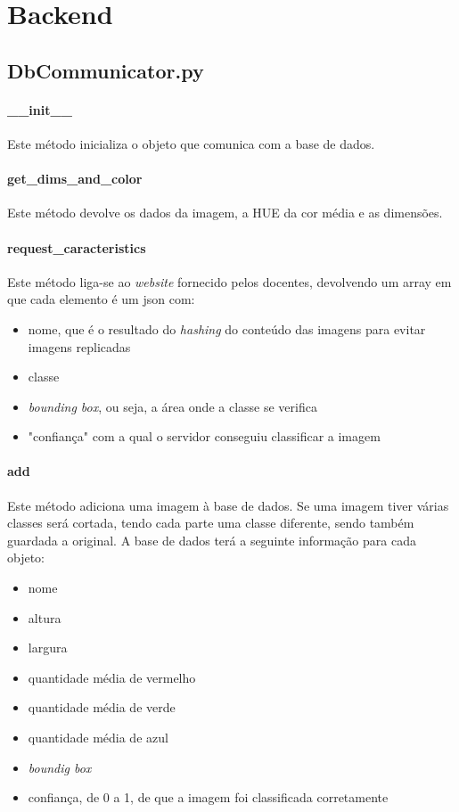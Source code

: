 \documentclass{report}
\begin{document}
\section{Backend}
\subsection{DbCommunicator.py}
\paragraph{\_\_init\_\_}
Este método inicializa o objeto que comunica com a base de dados.

\paragraph{get\_dims\_and\_color}
Este método devolve os dados da imagem, a HUE da cor média e as dimensões. 

\paragraph{request\_caracteristics}
Este método liga-se ao \textit{website} fornecido pelos docentes, devolvendo um array em que cada elemento é um \ac{json} com:
\begin{itemize}
\item nome, que é o resultado do \textit{hashing} do conteúdo das imagens para evitar imagens replicadas
\item classe
\item \textit{bounding box}, ou seja, a área onde a classe se verifica
\item "confiança" com a qual o servidor conseguiu classificar a imagem
\end{itemize}

\paragraph{add}
Este método adiciona uma imagem à base de dados. Se uma imagem tiver várias classes será cortada, 
tendo cada parte uma classe diferente, sendo também guardada a original. A base de dados terá a 
seguinte informação para cada objeto:
\begin{itemize}
\item nome
\item altura
\item largura
\item quantidade média de vermelho
\item quantidade média de verde
\item quantidade média de azul
\item \textit{boundig box}
\item confiança, de 0 a 1, de que a imagem foi classificada corretamente
\end{itemize}
\end{document}
